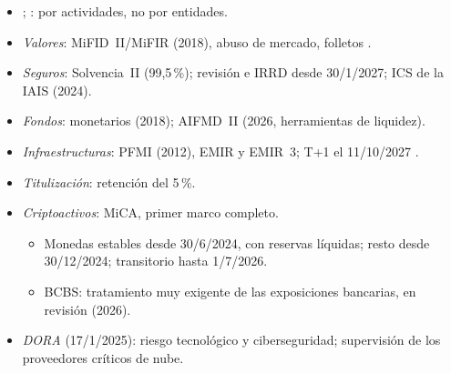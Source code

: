 \documentclass{article}
\begin{document}
\begin{columnas}
\begin{itemize}
\item {}; : por actividades, no por entidades.
\item \emph{Valores}: MiFID~II/MiFIR (2018), abuso de mercado, folletos .
\item \emph{Seguros}: Solvencia~II (99,5\,\%); revisión e IRRD desde 30/1/2027; ICS de la IAIS (2024).
\item \emph{Fondos}: monetarios (2018); AIFMD~II (2026, herramientas de liquidez).
\item \emph{Infraestructuras}: PFMI (2012), EMIR y EMIR~3; T+1 el 11/10/2027 .
\item \emph{Titulización}: retención del 5\,\%.
\item \emph{Criptoactivos}: MiCA, primer marco completo.
  \begin{itemize}
  \item Monedas estables desde 30/6/2024, con reservas líquidas; resto desde 30/12/2024; transitorio hasta 1/7/2026.
  \item BCBS: tratamiento muy exigente de las exposiciones bancarias, en revisión (2026).
  \end{itemize}
\item \emph{DORA} (17/1/2025): riesgo tecnológico y ciberseguridad; supervisión de los proveedores críticos de nube.
\end{itemize}


\end{columnas}
\end{document}
